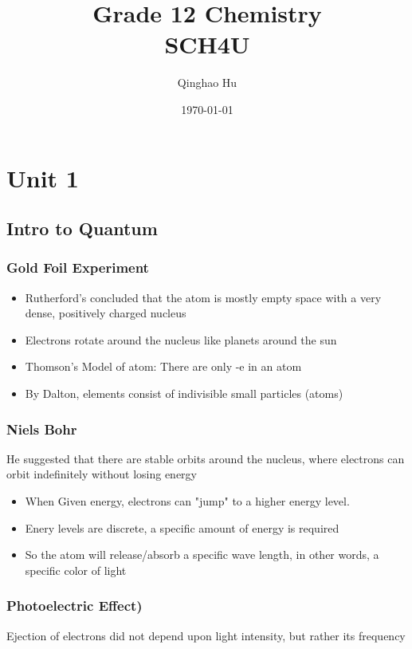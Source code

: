 \documentclass[11pt]{report}
\title{\textbf{Grade 12 Chemistry} \\ \large SCH4U}
\author{Qinghao Hu}
\date{\today}
\theoremstyle{remark}
\begin{document}
\maketitle
\newpage
\tableofcontents
\newpage

\chapter{Unit 1}
\section{Intro to Quantum}
\subsection{Gold Foil Experiment}
\begin{itemize}
    \item Rutherford's concluded that the atom is mostly empty space with a very dense, positively charged nucleus
    \item Electrons rotate around the nucleus like planets around the sun
    \item Thomson's Model of atom: There are only -e in an atom
    \item By Dalton, elements consist of indivisible small particles (atoms)
\end{itemize}

\subsection{Niels Bohr}
He suggested that there are stable orbits around the nucleus, where electrons can orbit indefinitely without losing energy

\begin{center}
    \begin{itemize}
        \item When Given energy, electrons can "jump" to a higher energy level. 
        \item Enery levels are discrete, a specific amount of energy is required
        \item So the atom will release/absorb a specific wave length, in other words, a specific color of light
    \end{itemize}    
\end{center}

\subsection{Photoelectric Effect)}
Ejection of electrons did not depend upon light intensity, but rather its frequency
\end{document}
